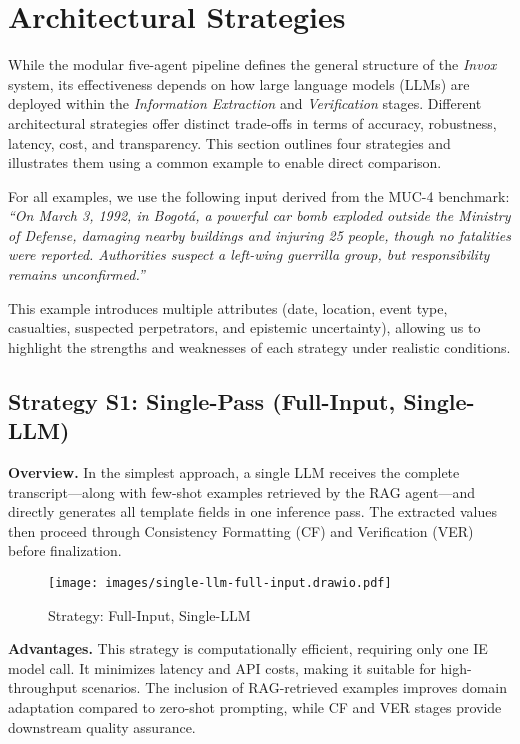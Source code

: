\section{Architectural Strategies}
\label{sec:architectural-strategies}

While the modular five-agent pipeline defines the general structure of the \textit{Invox} system, its effectiveness depends on how large language models (LLMs) are deployed within the \textit{Information Extraction} and \textit{Verification} stages. Different architectural strategies offer distinct trade-offs in terms of accuracy, robustness, latency, cost, and transparency. This section outlines four strategies and illustrates them using a common example to enable direct comparison.

For all examples, we use the following input derived from the MUC-4 benchmark:  
\textit{``On March 3, 1992, in Bogotá, a powerful car bomb exploded outside the Ministry of Defense, damaging nearby buildings and injuring 25 people, though no fatalities were reported. Authorities suspect a left-wing guerrilla group, but responsibility remains unconfirmed.''}

This example introduces multiple attributes (date, location, event type, casualties, suspected perpetrators, and epistemic uncertainty), allowing us to highlight the strengths and weaknesses of each strategy under realistic conditions.

\subsection{Strategy S1: Single-Pass (Full-Input, Single-LLM)}
\label{subsec:strategy-s1}

\textbf{Overview.}  
In the simplest approach, a single LLM receives the complete transcript—along with few-shot examples retrieved by the RAG agent—and directly generates all template fields in one inference pass. The extracted values then proceed through Consistency Formatting (CF) and Verification (VER) before finalization.

\begin{figure}[H]
  \centering
  \texttt{[image: images/single-llm-full-input.drawio.pdf]}
  \caption{Strategy: Full-Input, Single-LLM}
  \label{fig:single-llm-full-input}
\end{figure}

\textbf{Advantages.}  
This strategy is computationally efficient, requiring only one IE model call. It minimizes latency and API costs, making it suitable for high-throughput scenarios. The inclusion of RAG-retrieved examples improves domain adaptation compared to zero-shot prompting, while CF and VER stages provide downstream quality assurance.

